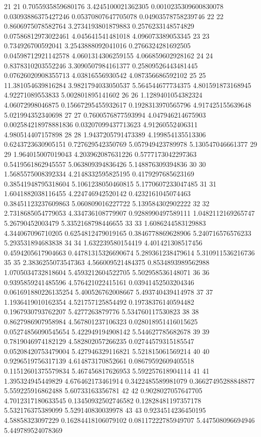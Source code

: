 {21 21 0.7055935859680176 3.4245100021362305 0.0010235309600830078 0.03093886375427246 0.05370807647705078 0.04903578758239746
22 22 0.8606975078582764 3.2734193801879883 0.2576233148574829 0.07586812973022461 4.045641541481018 4.096073389053345
23 23 0.734926700592041 3.2543888092041016 0.2766324281692505 0.04598712921142578 4.0601314306259155 4.066859602928162
24 24 0.8378310203552246 3.3090507984161377 0.25809526443481445 0.07626020908355713 4.03816556930542 4.087356686592102
25 25 11.381054639816284 3.9821794033050537 5.564544677734375 4.801591873168945 4.92271089553833 5.002801895141602
26 26 1.1289401054382324 4.06072998046875 0.15667295455932617 0.1928313970565796 4.917425155639648 5.021994352340698
27 27 0.7600576877593994 4.047946214675903 0.002584218978881836 0.03207099437713623 4.91260552406311 4.980514407157898
28 28 1.9437205791473389 4.199854135513306 0.6243723630905151 0.727629542350769 5.057949423789978 5.130547046661377
29 29 1.964015007019043 4.203962087631226 0.5777173042297363 0.5419561862945557 5.063809394836426 5.148876309394836
30 30 1.5685575008392334 4.2148332595825195 0.4179297685623169 0.38541948795318604 5.1061238050460815 5.1770607233047485
31 31 1.6041882038116455 4.224746942520142 0.4232161045074463 0.38451123237609863 5.060809016227722 5.139584302902222
32 32 2.7318685054779053 4.334736108779907 0.9288990497589111 1.0482112169265747 5.26790452003479 5.3352168798446655
33 33 1.6086244583129883 4.344067096710205 0.6254812479019165 0.3846778869628906 5.240716576576233 5.293531894683838
34 34 1.632239580154419 4.401421308517456 0.4594205617904663 0.44781315326690674 5.289361238479614 5.310911536216736
35 35 2.3836255073547363 4.566009521484375 0.8534893989562988 1.0705034732818604 5.4593212604522705 5.502958536148071
36 36 0.9395859241485596 4.576421022415161 0.03941452503204346 0.061691880226135254 5.400526762008667 5.493740439414978
37 37 1.1936419010162354 4.521757125854492 0.19738376140594482 0.1967930793762207 5.4277263879776 5.534760117530823
38 38 0.8627986907958984 4.567801237106323 0.028018951416015625 0.05274856090545654 5.422949194908142 5.544627785682678
39 39 0.7819046974182129 4.582802057266235 0.02744579315185547 0.05208420753479004 5.427946329116821 5.521815061569214
40 40 0.9296519756317139 4.614873170852661 0.08679592609405518 0.11512601375579834 5.467456817626953 5.592257618904114
41 41 1.395324945449829 4.676462173461914 0.3422485589981079 0.36627495288848877 5.559225916862488 5.60733163356781
42 42 0.9028027057647705 4.7012317180633545 0.13450932502746582 0.12828481197357178 5.532176375389099 5.529140830039978
43 43 0.9234514236450195 4.58858323097229 0.16284418106079102 0.08117222785949707 5.447508096694946 5.449789524078369
}\tableexpiploadskltweet
